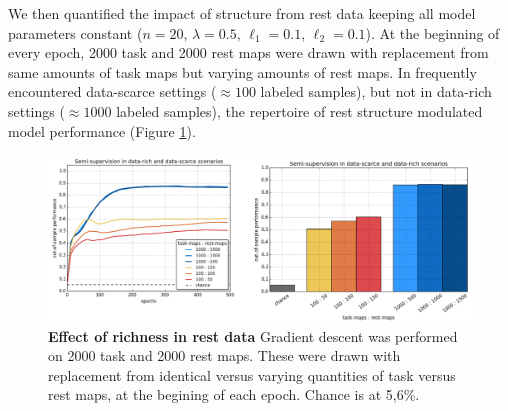 \documentclass{article} %
\begin{document}
We then quantified the impact of structure from rest data keeping
all model parameters constant
($n=20$, $\lambda=0.5$, $\ell_1=0.1$, $\ell_2=0.1$).
At the beginning of every epoch,
2000 task and 2000 rest maps were drawn with replacement
from same amounts of task maps but varying amounts of rest maps.
In frequently encountered data-scarce settings
($\approx{100}$ labeled samples),
but not in data-rich settings ($\approx{1000}$ labeled samples),
the repertoire of rest structure modulated model performance
(Figure \ref{fig_semisup}).

\begin{figure}
\begin{centering}
\includegraphics[width=1.00\textwidth]{figures/semisup_both.png}
\end{centering}
\vspace{-0.5cm}
\caption{\textbf{Effect of richness in rest data}
Gradient descent was performed on 2000 task and 2000 rest maps.
These were drawn with replacement from identical versus varying
quantities of task versus rest maps, at the begining of each epoch.
Chance is at 5,6\%.
}
\label{fig_semisup}
\end{figure}
\end{document}
